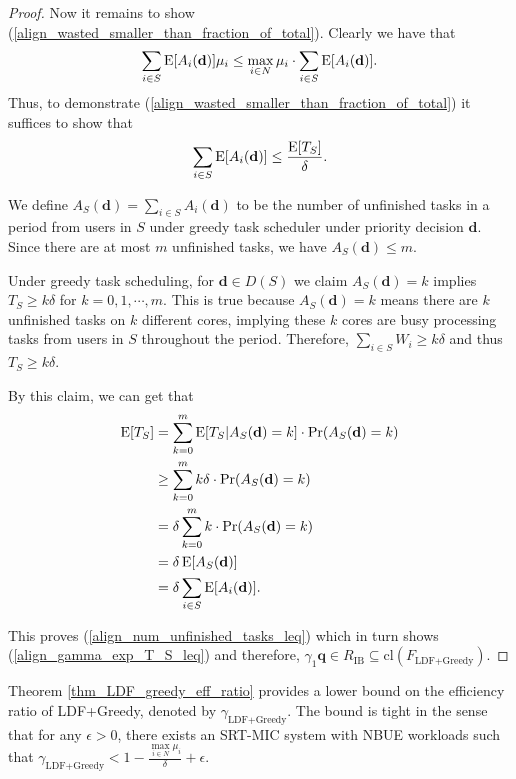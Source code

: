 \documentclass[prodmode,acmtompecs]{acmsmall}
\newcommand{\reqvec}{\mathbf{q}}
\newcommand{\fullUserSet}{N}
\newcommand{\myComments}[1]{}
\newif\ifinfocom
\newif\iftompecs
\newcommand{\infocomStart}{\ifinfocom \myComments{Infocom: }}
\newcommand{\tompecsStart}{\iftompecs \myComments{TOMPECS version: }}
\newcommand{\commentEnd}{\myComments{End}}
\begin{document}
\begin{proof}
Now it remains to show (\ref{align_wasted_smaller_than_fraction_of_total}). 
Clearly we have that
$$
\sum\limits_{i\in S}\expectation[A_i(\mathbf{d})] \mu_i \leq \max\limits_{i\in \fullUserSet} \mu_i \cdot \sum\limits_{i\in S} \expectation[A_i(\mathbf{d})]. 
$$
Thus, to demonstrate (\ref{align_wasted_smaller_than_fraction_of_total}) it suffices to show that
\begin{align}
\label{align_num_unfinished_tasks_leq}
\sum\limits_{i\in S} \operatorname*{\mathrm{E}}[A_i(\mathbf{d})] \leq \frac{\operatorname*{\mathrm{E}}[T_S]}{\delta}. 
\end{align}


We define $A_S(\mathbf{d}) = \sum\limits_{i\in S} A_i(\mathbf{d})$ to be the number of unfinished tasks in a period from users in $S$ under greedy task scheduler under priority decision $\mathbf{d}$. Since there are at most $m$ unfinished tasks, we have $A_S(\mathbf{d}) \leq m$. 

Under greedy task scheduling, for $\mathbf{d} \in D(S)$ we claim $A_S(\mathbf{d}) = k$ implies $T_S \geq k\delta$ for $k = 0, 1, \cdots, m$. This is true because $A_S(\mathbf{d}) = k$ means there are $k$ unfinished tasks on $k$ different cores, implying these $k$ cores are busy processing tasks from users in $S$ throughout the period.
Therefore, $\sum\limits_{i \in S}W_i \geq k\delta$ and thus $T_S \geq k\delta$. 


By this claim, we can get that
\begin{align*}
\operatorname*{\mathrm{E}}[T_S] & = \sum\limits_{k = 0}^{m} \operatorname*{\mathrm{E}}[T_S | A_S(\mathbf{d}) = k] \cdot \Pr(A_S(\mathbf{d}) = k)	\\
& \geq \sum\limits_{k = 0}^{m} k\delta \cdot \Pr(A_S(\mathbf{d}) = k)	\\
& = \delta \sum\limits_{k = 0}^{m} k \cdot \Pr(A_S(\mathbf{d}) = k)	\\
& = \delta \operatorname*{\mathrm{E}}[A_S(\mathbf{d})]	\\
& = \delta \sum\limits_{i\in S} \operatorname*{\mathrm{E}}[A_i(\mathbf{d})]. 
\end{align*}


This proves 
(\ref{align_num_unfinished_tasks_leq}) 
which in turn shows (\ref{align_gamma_exp_T_S_leq}) and therefore,
$
\gamma_1 \reqvec \in R_{\text{IB}} \subseteq \text{cl}(F_{\text{LDF+Greedy}}). 
$

\end{proof}
\commentEnd\fi

Theorem \ref{thm_LDF_greedy_eff_ratio} provides a lower bound on the efficiency ratio of LDF+Greedy, denoted by $\gamma_\text{LDF+Greedy}$. The bound is tight in the sense that for any $\epsilon > 0$, there exists an SRT-MIC  system with NBUE workloads such that $\gamma_{\text{LDF+Greedy}} < 1 - \frac{\max\limits_{i\in \fullUserSet} \mu_i}{\delta} + \epsilon$. 
\infocomStart
Such a system is also detailed in \cite{EXT}. 
\commentEnd\fi
\tompecsStart
Such a system is detailed in Appendix \ref{appendix_example_showing_theorem_LDF_Greedy_eff_ratio_is_tight}. 
\commentEnd\fi
\end{document}
